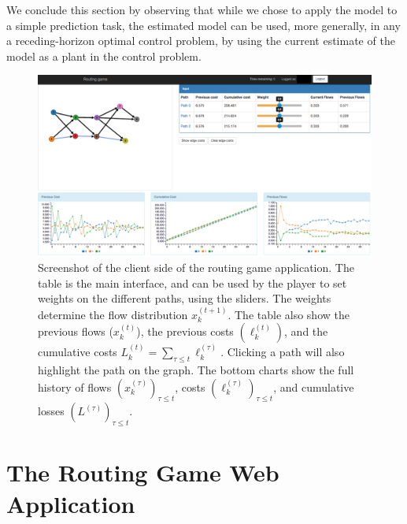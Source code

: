 \documentclass{sig-alternate-ipsn13}
\begin{document}
We conclude this section by observing that while we chose to apply the model to a simple prediction task, the estimated model can be used, more generally, in any a receding-horizon optimal control problem, by using the current estimate of the model as a plant in the control problem.
\begin{figure}
\centering
\includegraphics[width=.75\textwidth]{images/user_interface}
\caption{\footnotesize Screenshot of the client side of the routing game application. The table is the main interface, and can be used by the player to set weights on the different paths, using the sliders. The weights determine the flow distribution $x^{(t+1)}_k$. The table also show the previous flows ($x^{(t)}_k$), the previous costs $(\ell^{(t)}_k)$, and the cumulative costs $L^{(t)}_k = \sum_{\tau \leq t} \ell^{(\tau)}_k$. Clicking a path will also highlight the path on the graph. The bottom charts show the full history of flows $(x^{(\tau)}_k)_{\tau \leq t}$, costs $(\ell^{(\tau)}_k)_{\tau \leq t}$, and cumulative losses $(L^{(\tau)})_{\tau \leq t}$.}
\label{fig:game_interface}
\label{fig:system_block_diagram}
\end{figure}
\section{The Routing Game Web Application}
\label{sec:experiment}

\end{document}
